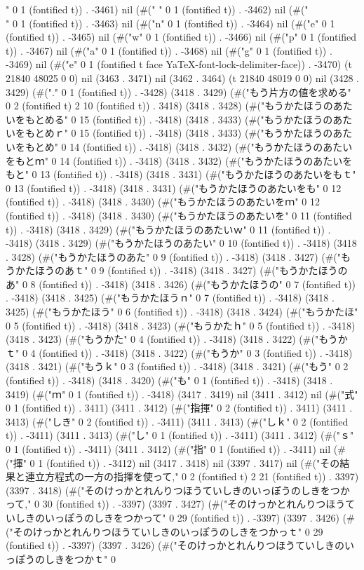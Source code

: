 " 0 1 (fontified t)) . -3461) nil (#("
" 0 1 (fontified t)) . -3462) nil (#("\\" 0 1 (fontified t)) . -3463) nil (#("n" 0 1 (fontified t)) . -3464) nil (#("e" 0 1 (fontified t)) . -3465) nil (#("w" 0 1 (fontified t)) . -3466) nil (#("p" 0 1 (fontified t)) . -3467) nil (#("a" 0 1 (fontified t)) . -3468) nil (#("g" 0 1 (fontified t)) . -3469) nil (#("e" 0 1 (fontified t face YaTeX-font-lock-delimiter-face)) . -3470) (t 21840 48025 0 0) nil (3463 . 3471) nil (3462 . 3464) (t 21840 48019 0 0) nil (3428 . 3429) (#("." 0 1 (fontified t)) . -3428) (3418 . 3429) (#("もう片方の値を求める" 0 2 (fontified t) 2 10 (fontified t)) . 3418) (3418 . 3428) (#("もうかたほうのあたいをもとめる" 0 15 (fontified t)) . -3418) (3418 . 3433) (#("もうかたほうのあたいをもとめｒ" 0 15 (fontified t)) . -3418) (3418 . 3433) (#("もうかたほうのあたいをもとめ" 0 14 (fontified t)) . -3418) (3418 . 3432) (#("もうかたほうのあたいをもとｍ" 0 14 (fontified t)) . -3418) (3418 . 3432) (#("もうかたほうのあたいをもと" 0 13 (fontified t)) . -3418) (3418 . 3431) (#("もうかたほうのあたいをもｔ" 0 13 (fontified t)) . -3418) (3418 . 3431) (#("もうかたほうのあたいをも" 0 12 (fontified t)) . -3418) (3418 . 3430) (#("もうかたほうのあたいをｍ" 0 12 (fontified t)) . -3418) (3418 . 3430) (#("もうかたほうのあたいを" 0 11 (fontified t)) . -3418) (3418 . 3429) (#("もうかたほうのあたいｗ" 0 11 (fontified t)) . -3418) (3418 . 3429) (#("もうかたほうのあたい" 0 10 (fontified t)) . -3418) (3418 . 3428) (#("もうかたほうのあた" 0 9 (fontified t)) . -3418) (3418 . 3427) (#("もうかたほうのあｔ" 0 9 (fontified t)) . -3418) (3418 . 3427) (#("もうかたほうのあ" 0 8 (fontified t)) . -3418) (3418 . 3426) (#("もうかたほうの" 0 7 (fontified t)) . -3418) (3418 . 3425) (#("もうかたほうｎ" 0 7 (fontified t)) . -3418) (3418 . 3425) (#("もうかたほう" 0 6 (fontified t)) . -3418) (3418 . 3424) (#("もうかたほ" 0 5 (fontified t)) . -3418) (3418 . 3423) (#("もうかたｈ" 0 5 (fontified t)) . -3418) (3418 . 3423) (#("もうかた" 0 4 (fontified t)) . -3418) (3418 . 3422) (#("もうかｔ" 0 4 (fontified t)) . -3418) (3418 . 3422) (#("もうか" 0 3 (fontified t)) . -3418) (3418 . 3421) (#("もうｋ" 0 3 (fontified t)) . -3418) (3418 . 3421) (#("もう" 0 2 (fontified t)) . -3418) (3418 . 3420) (#("も" 0 1 (fontified t)) . -3418) (3418 . 3419) (#("ｍ" 0 1 (fontified t)) . -3418) (3417 . 3419) nil (3411 . 3412) nil (#("式" 0 1 (fontified t)) . 3411) (3411 . 3412) (#("指揮" 0 2 (fontified t)) . 3411) (3411 . 3413) (#("しき" 0 2 (fontified t)) . -3411) (3411 . 3413) (#("しｋ" 0 2 (fontified t)) . -3411) (3411 . 3413) (#("し" 0 1 (fontified t)) . -3411) (3411 . 3412) (#("ｓ" 0 1 (fontified t)) . -3411) (3411 . 3412) (#("指" 0 1 (fontified t)) . -3411) nil (#("揮" 0 1 (fontified t)) . -3412) nil (3417 . 3418) nil (3397 . 3417) nil (#("その結果と連立方程式の一方の指揮を使って," 0 2 (fontified t) 2 21 (fontified t)) . 3397) (3397 . 3418) (#("そのけっかとれんりつほうていしきのいっぽうのしきをつかって," 0 30 (fontified t)) . -3397) (3397 . 3427) (#("そのけっかとれんりつほうていしきのいっぽうのしきをつかって" 0 29 (fontified t)) . -3397) (3397 . 3426) (#("そのけっかとれんりつほうていしきのいっぽうのしきをつかっｔ" 0 29 (fontified t)) . -3397) (3397 . 3426) (#("そのけっかとれんりつほうていしきのいっぽうのしきをつかｔ" 0 